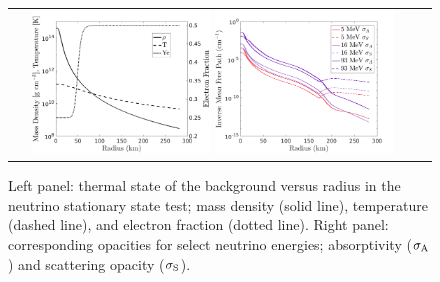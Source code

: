 \begin{figure}[h]
  \centering
  \begin{tabular}{cc}
    \includegraphics[width=0.45\textwidth]{figures/NStatinaryS_EOS}
    \hspace{30pt}
    \includegraphics[width=0.45\textwidth]{figures/NSS_Opacities}
  \end{tabular}
   \caption{Left panel: thermal state of the background versus radius in the neutrino stationary state test; mass density (solid line), temperature (dashed line), and electron fraction (dotted line).  Right panel: corresponding opacities for select neutrino energies; absorptivity ($\sigma_{{\rm A}}$) and scattering opacity ($ \sigma_{{\rm S}}$).}
   \label{fig:NeutrinoStationaryTestEOS}
\end{figure}

